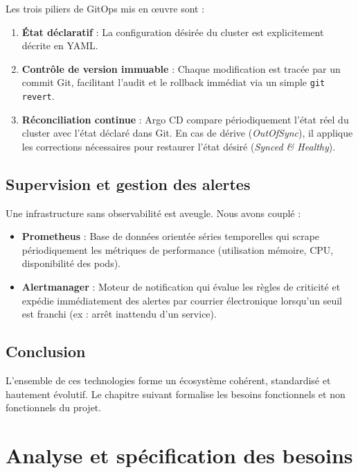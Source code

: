 \documentclass[12pt,a4paper,oneside]{report}
\begin{document}
Les trois piliers de GitOps mis en œuvre sont :
\begin{enumerate}
    \item \textbf{État déclaratif} : La configuration désirée du cluster est explicitement décrite en YAML.
    \item \textbf{Contrôle de version immuable} : Chaque modification est tracée par un commit Git, facilitant l'audit et le rollback immédiat via un simple \texttt{git revert}.
    \item \textbf{Réconciliation continue} : Argo CD compare périodiquement l'état réel du cluster avec l'état déclaré dans Git. En cas de dérive (\textit{OutOfSync}), il applique les corrections nécessaires pour restaurer l'état désiré (\textit{Synced \& Healthy}).
\end{enumerate}

\section{Supervision et gestion des alertes}
Une infrastructure sans observabilité est aveugle. Nous avons couplé :
\begin{itemize}[label=$\bullet$]
    \item \textbf{Prometheus} : Base de données orientée séries temporelles qui scrape périodiquement les métriques de performance (utilisation mémoire, CPU, disponibilité des pods).
    \item \textbf{Alertmanager} : Moteur de notification qui évalue les règles de criticité et expédie immédiatement des alertes par courrier électronique lorsqu'un seuil est franchi (ex : arrêt inattendu d'un service).
\end{itemize}

\section{Conclusion}
L'ensemble de ces technologies forme un écosystème cohérent, standardisé et hautement évolutif. Le chapitre suivant formalise les besoins fonctionnels et non fonctionnels du projet.

\clearpage

\chapter{Analyse et spécification des besoins}
\end{document}
